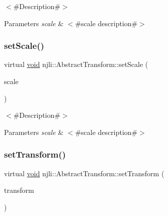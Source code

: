 $<$\#\+Description\#$>$


\begin{DoxyParams}{Parameters}
{\em scale} & $<$\#scale description\#$>$ \\
\hline
\end{DoxyParams}
\mbox{\label{classnjli_1_1_abstract_transform_ab3fe736cb93cd9853a675131f34404ff}} 
\subsubsection{\texorpdfstring{set\+Scale()}{setScale()}\hspace{0.1cm}{\footnotesize\ttfamily [2/2]}}
{\footnotesize\ttfamily virtual \mbox{\hyperlink{_thread_8h_af1e856da2e658414cb2456cb6f7ebc66}{void}} njli\+::\+Abstract\+Transform\+::set\+Scale (\begin{DoxyParamCaption}\item[{const \mbox{\hyperlink{_util_8h_a5f6906312a689f27d70e9d086649d3fd}{f32}}}]{scale }\end{DoxyParamCaption})\hspace{0.3cm}{\ttfamily [virtual]}}

$<$\#\+Description\#$>$


\begin{DoxyParams}{Parameters}
{\em scale} & $<$\#scale description\#$>$ \\
\hline
\end{DoxyParams}
\mbox{\label{classnjli_1_1_abstract_transform_a87650e2ff117cde3128c9de164c84b2b}} 
\subsubsection{\texorpdfstring{set\+Transform()}{setTransform()}}
{\footnotesize\ttfamily virtual \mbox{\hyperlink{_thread_8h_af1e856da2e658414cb2456cb6f7ebc66}{void}} njli\+::\+Abstract\+Transform\+::set\+Transform (\begin{DoxyParamCaption}\item[{const bt\+Transform \&}]{transform }\end{DoxyParamCaption})\hspace{0.3cm}{\ttfamily [virtual]}}

